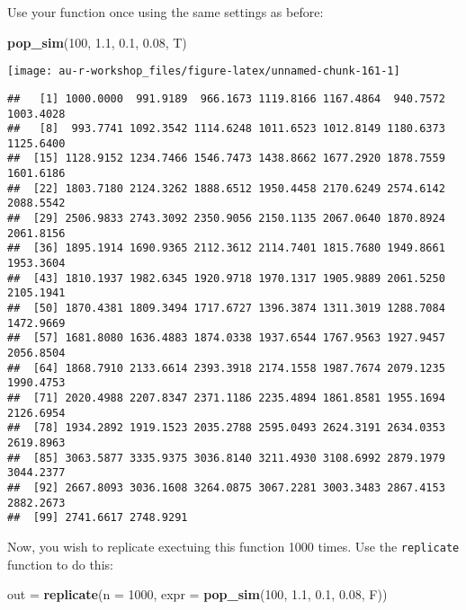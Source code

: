 \documentclass[]{book}
\newenvironment{Shaded}{\begin{snugshade}}{\end{snugshade}}
\newcommand{\KeywordTok}[1]{\textcolor[rgb]{0.13,0.29,0.53}{\textbf{#1}}}
\newcommand{\DataTypeTok}[1]{\textcolor[rgb]{0.13,0.29,0.53}{#1}}
\newcommand{\DecValTok}[1]{\textcolor[rgb]{0.00,0.00,0.81}{#1}}
\newcommand{\FloatTok}[1]{\textcolor[rgb]{0.00,0.00,0.81}{#1}}
\newcommand{\StringTok}[1]{\textcolor[rgb]{0.31,0.60,0.02}{#1}}
\newcommand{\NormalTok}[1]{#1}
\theoremstyle{definition}
\theoremstyle{definition}
\theoremstyle{definition}
\theoremstyle{remark}
\begin{document}
Use your function once using the same settings as before:

\begin{Shaded}
\begin{Highlighting}[]
\KeywordTok{pop_sim}\NormalTok{(}\DecValTok{100}\NormalTok{, }\FloatTok{1.1}\NormalTok{, }\FloatTok{0.1}\NormalTok{, }\FloatTok{0.08}\NormalTok{, T)}
\end{Highlighting}
\end{Shaded}

\begin{center}\texttt{[image: au-r-workshop\_files/figure-latex/unnamed-chunk-161-1]} \end{center}

\begin{verbatim}
##   [1] 1000.0000  991.9189  966.1673 1119.8166 1167.4864  940.7572 1003.4028
##   [8]  993.7741 1092.3542 1114.6248 1011.6523 1012.8149 1180.6373 1125.6400
##  [15] 1128.9152 1234.7466 1546.7473 1438.8662 1677.2920 1878.7559 1601.6186
##  [22] 1803.7180 2124.3262 1888.6512 1950.4458 2170.6249 2574.6142 2088.5542
##  [29] 2506.9833 2743.3092 2350.9056 2150.1135 2067.0640 1870.8924 2061.8156
##  [36] 1895.1914 1690.9365 2112.3612 2114.7401 1815.7680 1949.8661 1953.3604
##  [43] 1810.1937 1982.6345 1920.9718 1970.1317 1905.9889 2061.5250 2105.1941
##  [50] 1870.4381 1809.3494 1717.6727 1396.3874 1311.3019 1288.7084 1472.9669
##  [57] 1681.8080 1636.4883 1874.0338 1937.6544 1767.9563 1927.9457 2056.8504
##  [64] 1868.7910 2133.6614 2393.3918 2174.1558 1987.7674 2079.1235 1990.4753
##  [71] 2020.4988 2207.8347 2371.1186 2235.4894 1861.8581 1955.1694 2126.6954
##  [78] 1934.2892 1919.1523 2035.2788 2595.0493 2624.3191 2634.0353 2619.8963
##  [85] 3063.5877 3335.9375 3036.8140 3211.4930 3108.6992 2879.1979 3044.2377
##  [92] 2667.8093 3036.1608 3264.0875 3067.2281 3003.3483 2867.4153 2882.2673
##  [99] 2741.6617 2748.9291
\end{verbatim}

Now, you wish to replicate exectuing this function 1000 times. Use the
\texttt{replicate} function to do this:

\begin{Shaded}
\begin{Highlighting}[]
\NormalTok{out =}\StringTok{ }\KeywordTok{replicate}\NormalTok{(}\DataTypeTok{n =} \DecValTok{1000}\NormalTok{, }\DataTypeTok{expr =} \KeywordTok{pop_sim}\NormalTok{(}\DecValTok{100}\NormalTok{, }\FloatTok{1.1}\NormalTok{, }\FloatTok{0.1}\NormalTok{, }\FloatTok{0.08}\NormalTok{, F))}
\end{Highlighting}
\end{Shaded}
\end{document}

